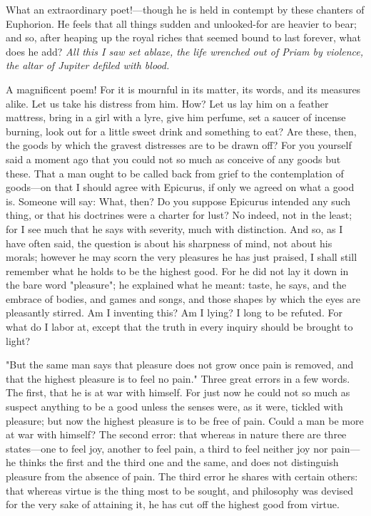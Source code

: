  What an extraordinary poet!—though he is held in contempt by these chanters of Euphorion. He feels that all things sudden and unlooked-for are heavier to bear; and so, after heaping up the royal riches that seemed bound to last forever, what does he add? \textit{All this I saw set ablaze, the life wrenched out of Priam by violence, the altar of Jupiter defiled with blood.}

 A magnificent poem! For it is mournful in its matter, its words, and its measures alike. Let us take his distress from him. How? Let us lay him on a feather mattress, bring in a girl with a lyre, give him perfume, set a saucer of incense burning, look out for a little sweet drink and something to eat? Are these, then, the goods by which the gravest distresses are to be drawn off? For you yourself said a moment ago that you could not so much as conceive of any goods but these. That a man ought to be called back from grief to the contemplation of goods—on that I should agree with Epicurus, if only we agreed on what a good is. Someone will say: What, then? Do you suppose Epicurus intended any such thing, or that his doctrines were a charter for lust? No indeed, not in the least; for I see much that he says with severity, much with distinction. And so, as I have often said, the question is about his sharpness of mind, not about his morals; however he may scorn the very pleasures he has just praised, I shall still remember what he holds to be the highest good. For he did not lay it down in the bare word "pleasure"; he explained what he meant: taste, he says, and the embrace of bodies, and games and songs, and those shapes by which the eyes are pleasantly stirred. Am I inventing this? Am I lying? I long to be refuted. For what do I labor at, except that the truth in every inquiry should be brought to light?

 "But the same man says that pleasure does not grow once pain is removed, and that the highest pleasure is to feel no pain." Three great errors in a few words. The first, that he is at war with himself. For just now he could not so much as suspect anything to be a good unless the senses were, as it were, tickled with pleasure; but now the highest pleasure is to be free of pain. Could a man be more at war with himself? The second error: that whereas in nature there are three states—one to feel joy, another to feel pain, a third to feel neither joy nor pain—he thinks the first and the third one and the same, and does not distinguish pleasure from the absence of pain. The third error he shares with certain others: that whereas virtue is the thing most to be sought, and philosophy was devised for the very sake of attaining it, he has cut off the highest good from virtue.

